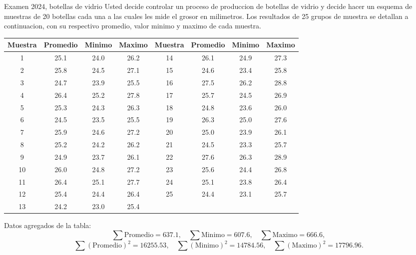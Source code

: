 \begin{enunciado}{Examen 2024, botellas de vidrio}
Usted decide controlar un proceso de produccion de botellas de vidrio y decide hacer un esquema de muestras de 20 botellas cada una a las cuales les mide el grosor en milimetros. Los resultados de 25 grupos de muestra se detallan a continuacion, con su respectivo promedio, valor minimo y maximo de cada muestra.

\begin{center}
\small
\begin{tabular}{c|ccc@{\hspace{1.2em}}c|ccc}
\toprule
Muestra & Promedio & Minimo & Maximo & Muestra & Promedio & Minimo & Maximo\\
\midrule
1 & 25.1 & 24.0 & 26.2 & 14 & 26.1 & 24.9 & 27.3\\
2 & 25.8 & 24.5 & 27.1 & 15 & 24.6 & 23.4 & 25.8\\
3 & 24.7 & 23.9 & 25.5 & 16 & 27.5 & 26.2 & 28.8\\
4 & 26.4 & 25.2 & 27.8 & 17 & 25.7 & 24.5 & 26.9\\
5 & 25.3 & 24.3 & 26.3 & 18 & 24.8 & 23.6 & 26.0\\
6 & 24.5 & 23.5 & 25.5 & 19 & 26.3 & 25.0 & 27.6\\
7 & 25.9 & 24.6 & 27.2 & 20 & 25.0 & 23.9 & 26.1\\
8 & 25.2 & 24.2 & 26.2 & 21 & 24.5 & 23.3 & 25.7\\
9 & 24.9 & 23.7 & 26.1 & 22 & 27.6 & 26.3 & 28.9\\
10 & 26.0 & 24.8 & 27.2 & 23 & 25.6 & 24.4 & 26.8\\
11 & 26.4 & 25.1 & 27.7 & 24 & 25.1 & 23.8 & 26.4\\
12 & 25.4 & 24.4 & 26.4 & 25 & 24.4 & 23.1 & 25.7\\
13 & 24.2 & 23.0 & 25.4 & & & &\\
\bottomrule
\end{tabular}
\end{center}

Datos agregados de la tabla:
\[
\sum \text{Promedio}=637.1,\quad
\sum \text{Minimo}=607.6,\quad
\sum \text{Maximo}=666.6,
\]
\[
\sum(\text{Promedio})^2=16255.53,\quad
\sum(\text{Minimo})^2=14784.56,\quad
\sum(\text{Maximo})^2=17796.96.
\]


\end{enunciado}
